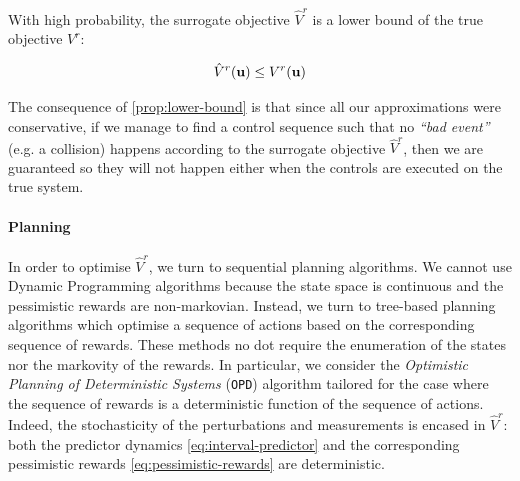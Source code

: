 \documentclass{article}
\begin{document}
\begin{proposition}
\label{prop:lower-bound}
With high probability, the surrogate objective $\hat{V}^r$ is a lower bound of the true objective $V^r$:

\begin{equation}
\hat{V}^r(\mathbf{u}) \leq V^r(\mathbf{u})
\end{equation}
\end{proposition}

The consequence of \autoref{prop:lower-bound} is that since all our approximations were conservative, if we manage to find a control sequence such that no \textit{``bad event''} (e.g. a collision) happens according to the surrogate objective $\hat{V}^r$, then we are guaranteed so they will not happen either when the controls are executed on the true system. 

\paragraph{Planning}
In order to optimise $\hat{V}^r$, we turn to sequential planning algorithms. We cannot use Dynamic Programming algorithms because the state space is continuous and the pessimistic rewards are non-markovian. Instead, we turn to tree-based planning algorithms which optimise a sequence of actions based on the corresponding sequence of rewards. These methods no dot require the enumeration of the states nor the markovity of the rewards. In particular, we consider the \emph{Optimistic Planning of Deterministic Systems} (\texttt{OPD}) algorithm \citep{Hren2008} tailored for the case where the sequence of rewards is a deterministic function of the sequence of actions. Indeed, the stochasticity of the perturbations and measurements is encased in $\hat{V}^r$: both the predictor dynamics \eqref{eq:interval-predictor} and the corresponding pessimistic rewards \eqref{eq:pessimistic-rewards} are deterministic.
\end{document}
